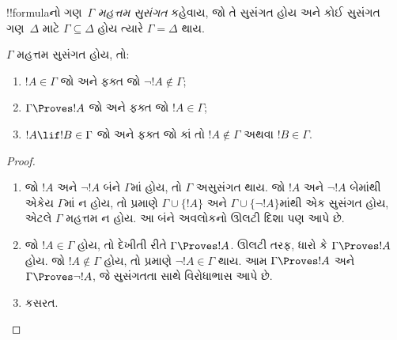 \documentclass[../../../include/open-logic-section]{subfiles}
\begin{document}


\begin{defn}
!!{formula}નો ગણ~$\Gamma$ \emph{મહત્તમ સુસંગત} કહેવાય,
જો તે સુસંગત હોય અને કોઈ સુસંગત ગણ~$\Delta$ માટે
$\Gamma \subseteq \Delta$ હોય ત્યારે $\Gamma = \Delta$ થાય.
\end{defn}

\begin{lem}[સત્ય સહાયક પ્રમેય]
$\Gamma$ મહત્તમ સુસંગત હોય, તો:
\begin{enumerate}
\item {} $!A \in \Gamma$ જો અને ફક્ત જો
  $\lnot !A \notin \Gamma$;
\item {} $\Gamma \Proves !A$ જો અને ફક્ત જો
  $!A \in \Gamma$;
\item {} $!A \lif !B \in \Gamma$ જો અને ફક્ત જો
  કાં તો $!A \notin \Gamma$ અથવા $!B \in \Gamma$.
\end{enumerate}
\end{lem}

\begin{proof}
\begin{enumerate}
\item જો $!A$ અને $\lnot !A$ બંને $\Gamma$માં હોય,
  તો $\Gamma$ અસુસંગત થાય. જો $!A$ અને $\lnot!A$ બેમાંથી એકેય
  $\Gamma$માં ન હોય, તો
   પ્રમાણે
  $\Gamma\cup\{!A\}$ અને $\Gamma \cup \{\lnot !A\}$માંથી
  એક સુસંગત હોય, એટલે $\Gamma$ મહત્તમ ન હોય.
  આ બંને અવલોકનો ઊલટી દિશા પણ આપે છે.
\item જો $!A \in \Gamma$ હોય, તો દેખીતી રીતે $\Gamma \Proves !A$.
  ઊલટી તરફ, ધારો કે $\Gamma \Proves !A$ હોય.
  જો $!A \notin \Gamma$ હોય, તો 
  પ્રમાણે $\lnot !A \in \Gamma$ થાય.
  આમ $\Gamma \Proves !A$ અને $\Gamma \Proves \lnot !A$,
  જે સુસંગતતા સાથે વિરોધાભાસ આપે છે.
\item કસરત.
\end{enumerate}
\end{proof}
\end{document}
